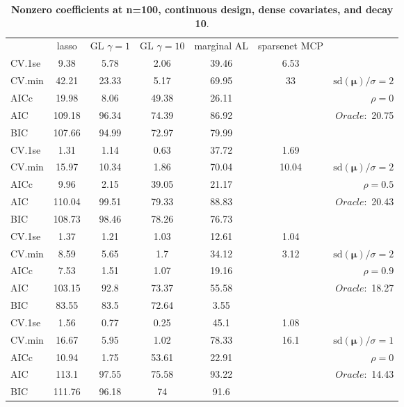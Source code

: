 \clearpage
\begin{table}\vspace{-.5cm}
\caption[l]{ { \bf Nonzero coefficients at n=100, continuous design, 
dense covariates, and  decay  10}.}
\vspace{-.5cm}
\footnotesize{}
\begin{center}
\begin{tabular}{l*{5}{c}|r}
& lasso & GL $\gamma=1$ & GL $\gamma=10$ & marginal AL & sparsenet MCP  & \\
 \cline{1-7}
CV.1se & 9.38 & 5.78 & 2.06 & 39.46 & 6.53 & \\
CV.min & 42.21 & 23.33 & 5.17 & 69.95 & 33 &  $\mathrm{sd}(\mathbf{\mu})/\sigma=2$ \\
AICc & 19.98 & 8.06 & 49.38 & 26.11 & & $\rho=0$ \\
AIC & 109.18 & 96.34 & 74.39 & 86.92 & &  \multirow{2}{*}{$Oracle: $ 20.75} \\
BIC & 107.66 & 94.99 & 72.97 & 79.99 & &  \\
 \hline 
CV.1se & 1.31 & 1.14 & 0.63 & 37.72 & 1.69 & \\
CV.min & 15.97 & 10.34 & 1.86 & 70.04 & 10.04 &  $\mathrm{sd}(\mathbf{\mu})/\sigma=2$ \\
AICc & 9.96 & 2.15 & 39.05 & 21.17 & & $\rho=0.5$ \\
AIC & 110.04 & 99.51 & 79.33 & 88.83 & &  \multirow{2}{*}{$Oracle: $ 20.43} \\
BIC & 108.73 & 98.46 & 78.26 & 76.73 & &  \\
 \hline 
CV.1se & 1.37 & 1.21 & 1.03 & 12.61 & 1.04 & \\
CV.min & 8.59 & 5.65 & 1.7 & 34.12 & 3.12 &  $\mathrm{sd}(\mathbf{\mu})/\sigma=2$ \\
AICc & 7.53 & 1.51 & 1.07 & 19.16 & & $\rho=0.9$ \\
AIC & 103.15 & 92.8 & 73.37 & 55.58 & &  \multirow{2}{*}{$Oracle: $ 18.27} \\
BIC & 83.55 & 83.5 & 72.64 & 3.55 & &  \\
 \hline 
CV.1se & 1.56 & 0.77 & 0.25 & 45.1 & 1.08 & \\
CV.min & 16.67 & 5.95 & 1.02 & 78.33 & 16.1 &  $\mathrm{sd}(\mathbf{\mu})/\sigma=1$ \\
AICc & 10.94 & 1.75 & 53.61 & 22.91 & & $\rho=0$ \\
AIC & 113.1 & 97.55 & 75.58 & 93.22 & &  \multirow{2}{*}{$Oracle: $ 14.43} \\
BIC & 111.76 & 96.18 & 74 & 91.6 & &  \\

\end{tabular}
\end{center}
\end{table}
